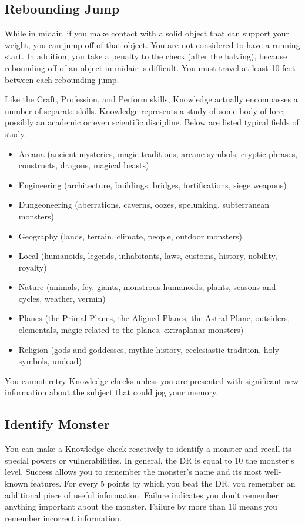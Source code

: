     \subsection{Rebounding Jump}\label{Rebounding Jump}
        While in midair, if you make contact with a solid object that can support your weight, you can jump off of that object. You are not considered to have a running start. In addition, you take a  penalty to the check (after the halving), because rebounding off of an object in midair is difficult. You must travel at least 10 feet between each rebounding jump.

        Like the Craft, Profession, and Perform skills, Knowledge actually encompasses a number of separate skills. Knowledge represents a study of some body of lore, possibly an academic or even scientific discipline. Below are listed typical fields of study.
        \begin{itemize}
            \item Arcana (ancient mysteries, magic traditions, arcane symbols,
                cryptic phrases, constructs, dragons, magical beasts)
            \item Engineering (architecture, buildings, bridges, fortifications, siege weapons)
            \item Dungeoneering (aberrations, caverns, oozes, spelunking, subterranean monsters)
            \item Geography (lands, terrain, climate, people, outdoor monsters)
            \item Local (humanoids, legends, inhabitants, laws, customs, history, nobility, royalty)
            \item Nature (animals, fey, giants, monstrous humanoids, plants, seasons and cycles, weather, vermin)
            \item Planes (the Primal Planes, the Aligned Planes, the Astral Plane,
                outsiders, elementals, magic related to the planes, extraplanar monsters)
            \item Religion (gods and goddesses, mythic history, ecclesiastic tradition, holy symbols, undead)
        \end{itemize}

        You cannot retry Knowledge checks unless you are presented with significant new information about the subject that could jog your memory.

    \subsection{Identify Monster}
        You can make a Knowledge check reactively to identify a monster and recall its special powers or vulnerabilities. In general, the DR is equal to 10 \add the monster's level. Success allows you to remember the monster's name and its most well-known features. For every 5 points by which you beat the DR, you remember an additional piece of useful information. Failure indicates you don't remember anything important about the monster. Failure by more than 10 means you remember incorrect information.

